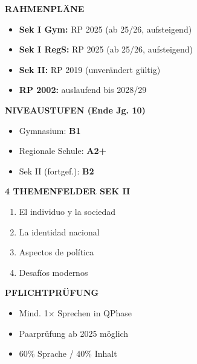 \documentclass[11pt,a4paper]{article}
\begin{document}
\begin{minipage}[t]{0.48\textwidth}
\textbf{\color{mainblue}RAHMENPLÄNE}
\begin{itemize}[leftmargin=0.3cm, itemsep=1pt, topsep=2pt]
\item \textbf{Sek I Gym:} RP 2025 (ab 25/26, aufsteigend)
\item \textbf{Sek I RegS:} RP 2025 (ab 25/26, aufsteigend)
\item \textbf{Sek II:} RP 2019 (unverändert gültig)
\item \textbf{RP 2002:} auslaufend bis 2028/29
\end{itemize}

\vspace{0.2cm}
\textbf{\color{mainblue}NIVEAUSTUFEN (Ende Jg. 10)}
\begin{itemize}[leftmargin=0.3cm, itemsep=1pt, topsep=2pt]
\item Gymnasium: \textbf{B1}
\item Regionale Schule: \textbf{A2+}
\item Sek II (fortgef.): \textbf{B2}
\end{itemize}

\vspace{0.2cm}
\textbf{\color{mainblue}4 THEMENFELDER SEK II}
\begin{enumerate}[leftmargin=0.5cm, itemsep=1pt, topsep=2pt]
\item El individuo y la sociedad
\item La identidad nacional
\item Aspectos de política
\item Desafíos modernos
\end{enumerate}

\vspace{0.2cm}
\textbf{\color{mainblue}PFLICHTPRÜFUNG}
\begin{itemize}[leftmargin=0.3cm, itemsep=1pt, topsep=2pt]
\item Mind. 1× Sprechen in QPhase
\item Paarprüfung ab 2025 möglich
\item 60\% Sprache / 40\% Inhalt
\end{itemize}
\end{minipage}
\hfill
\end{document}
